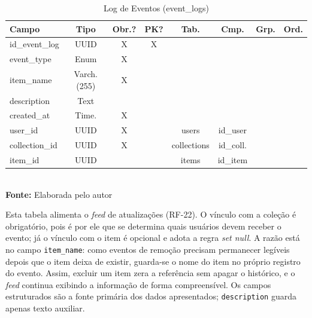 \FloatBarrier
\begin{table}[!htbp]
\centering
\caption{Log de Eventos (event\_logs)}
\footnotesize
\begin{tabularx}{\textwidth}{ | X | c | c | c | c | c | c | c | }
    \hline
    \textbf{Campo} & \textbf{Tipo} & \textbf{Obr.?} & \textbf{PK?} & \textbf{Tab.} & \textbf{Cmp.} & \textbf{Grp.} & \textbf{Ord.}\\ \hline
    id\_event\_log & UUID & X & X &  &  &  &  \\ \hline
    event\_type & Enum & X &  &  &  &  &  \\ \hline
    item\_name & Varch.(255) & X &  &  &  &  &  \\ \hline
    description & Text &  &  &  &  &  &  \\ \hline
    created\_at & Time. & X &  &  &  &  &  \\ \hline
    user\_id & UUID & X &  & users & id\_user &  &  \\ \hline
    collection\_id & UUID & X &  & collections & id\_coll. &  &  \\ \hline
    item\_id & UUID &  &  & items & id\_item &  &  \\ \hline
\end{tabularx}
\vspace{0.1cm} \\ \textbf{Fonte:} Elaborada pelo autor
\label{tab:tabelaEventLogDetalhado}
\end{table}

Esta tabela alimenta o \textit{feed} de atualizações (RF-22). O vínculo com a coleção é obrigatório, pois é por ele que se determina quais usuários devem receber o evento; já o vínculo com o item é opcional e adota a regra \textit{set null}. A razão está no campo \texttt{item\_name}: como eventos de remoção precisam permanecer legíveis depois que o item deixa de existir, guarda-se o nome do item no próprio registro do evento. Assim, excluir um item zera a referência sem apagar o histórico, e o \textit{feed} continua exibindo a informação de forma compreensível. Os campos estruturados são a fonte primária dos dados apresentados; \texttt{description} guarda apenas texto auxiliar.

